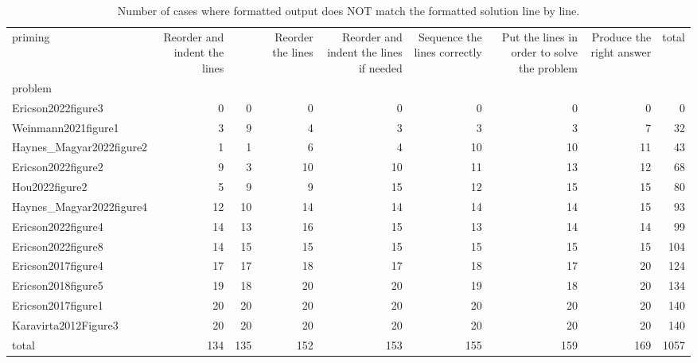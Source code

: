 \begin{table}
\caption{Number of cases where formatted output does NOT match the formatted solution line by line.}
\label{tab:pep8-matches}
\begin{tabular}{lrrrrrrrr}
\toprule
priming & Reorder and indent the lines &  & Reorder the lines & Reorder and indent the lines if needed & Sequence the lines correctly & Put the lines in order to solve the problem & Produce the right answer & total \\
problem &  &  &  &  &  &  &  &  \\
\midrule
Ericson2022figure3 & 0 & 0 & 0 & 0 & 0 & 0 & 0 & 0 \\
Weinmann2021figure1 & 3 & 9 & 4 & 3 & 3 & 3 & 7 & 32 \\
Haynes_Magyar2022figure2 & 1 & 1 & 6 & 4 & 10 & 10 & 11 & 43 \\
Ericson2022figure2 & 9 & 3 & 10 & 10 & 11 & 13 & 12 & 68 \\
Hou2022figure2 & 5 & 9 & 9 & 15 & 12 & 15 & 15 & 80 \\
Haynes_Magyar2022figure4 & 12 & 10 & 14 & 14 & 14 & 14 & 15 & 93 \\
Ericson2022figure4 & 14 & 13 & 16 & 15 & 13 & 14 & 14 & 99 \\
Ericson2022figure8 & 14 & 15 & 15 & 15 & 15 & 15 & 15 & 104 \\
Ericson2017figure4 & 17 & 17 & 18 & 17 & 18 & 17 & 20 & 124 \\
Ericson2018figure5 & 19 & 18 & 20 & 20 & 19 & 18 & 20 & 134 \\
Ericson2017figure1 & 20 & 20 & 20 & 20 & 20 & 20 & 20 & 140 \\
Karavirta2012Figure3 & 20 & 20 & 20 & 20 & 20 & 20 & 20 & 140 \\
total & 134 & 135 & 152 & 153 & 155 & 159 & 169 & 1057 \\
\bottomrule
\end{tabular}
\end{table}
